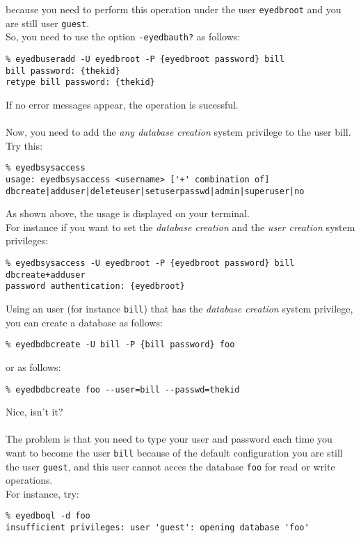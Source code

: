 \normalsize
because you need to perform this operation under the user \texttt{eyedbroot}
and you are still user \texttt{guest}.
\\
So, you need to use the option \texttt{-eyedbauth?} as follows:
\verbsize \begin{verbatim}
% eyedbuseradd -U eyedbroot -P {eyedbroot password} bill
bill password: {thekid}
retype bill password: {thekid}
\end{verbatim}
\normalsize
If no error messages appear, the operation is sucessful.
\\
\\
Now, you need to add the \emph{any database creation} system privilege
to the user bill.
\\
Try this:
\verbsize \begin{verbatim}
% eyedbsysaccess
usage: eyedbsysaccess <username> ['+' combination of] dbcreate|adduser|deleteuser|setuserpasswd|admin|superuser|no
\end{verbatim}
\normalsize
As shown above, the usage is displayed on your terminal.
\\
For instance if you want to set the \emph{database creation} and the
\emph{user creation} system privileges:
\verbsize \begin{verbatim}
% eyedbsysaccess -U eyedbroot -P {eyedbroot password} bill dbcreate+adduser 
password authentication: {eyedbroot}
\end{verbatim}
\normalsize
{}
Using an \eyedb user (for instance \texttt{bill}) that has the \emph{database
creation} system privilege, you can create a database as follows:
\verbsize \begin{verbatim}
% eyedbdbcreate -U bill -P {bill password} foo
\end{verbatim}
\normalsize
or as follows:
\verbsize \begin{verbatim}
% eyedbdbcreate foo --user=bill --passwd=thekid
\end{verbatim}
\normalsize
Nice, isn't it?
\\
\\
The problem is that you need to type your user and password each time you
want to become the user \texttt{bill} because of the default configuration
you are still the user \texttt{guest}, and this user cannot acces the
database \texttt{foo} for read or write operations.
\\
For instance, try:
\verbsize \begin{verbatim}
% eyedboql -d foo
insufficient privileges: user 'guest': opening database 'foo'
\end{verbatim}

